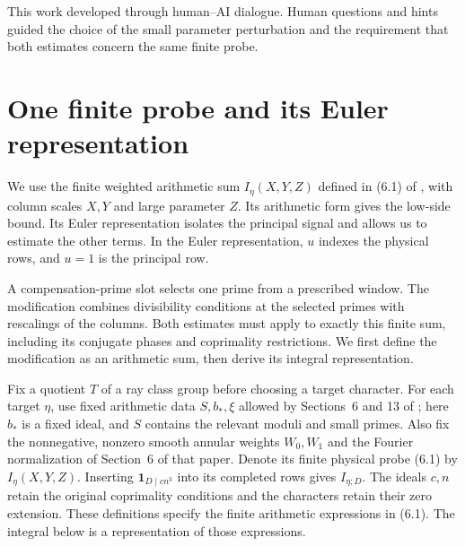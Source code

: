 \documentclass[10pt,reqno,a4paper]{amsart}
\theoremstyle{remark}
\newcommand{\one}{\mathbf 1}
\begin{document}
This work developed through human--AI dialogue. Human questions and
hints guided the choice of the small parameter perturbation and the
requirement that both estimates concern the same finite probe.

\section{One finite probe and its Euler representation}\label{sec-probe}

We use the finite weighted arithmetic sum $I_\eta(X,Y,Z)$ defined in
(6.1) of \cite{q30}, with column scales $X,Y$ and large parameter $Z$.
Its arithmetic form gives the low-side bound. Its Euler representation
isolates the principal signal and allows us to estimate the other terms.
In the Euler representation, $u$ indexes the physical rows, and $u=1$
is the principal row.

A compensation-prime slot selects one prime from a prescribed window.
The modification combines divisibility conditions at the selected primes
with rescalings of the columns. Both estimates must apply to exactly this
finite sum, including its conjugate phases and coprimality restrictions.
We first define the modification as an arithmetic sum, then derive its
integral representation.

Fix a quotient $T$ of a ray class group before choosing a target character.
For each target $\eta$, use fixed arithmetic data $S,b_*,\xi$ allowed
by Sections~6 and 13 of \cite{q30}; here $b_*$ is a fixed ideal, and $S$
contains the relevant moduli and small primes. Also fix the nonnegative,
nonzero smooth annular weights $W_0,W_1$ and the Fourier normalization of
Section~6 of that paper. Denote its finite physical probe (6.1) by
$I_\eta(X,Y,Z)$. Inserting $\one_{D\mid cn^3}$ into its completed rows
gives $I_{\eta;D}$. The ideals $c,n$ retain the original coprimality
conditions and the characters retain their zero extension. These definitions specify the finite arithmetic expressions in (6.1).
The integral below is a representation of those expressions.
\end{document}
